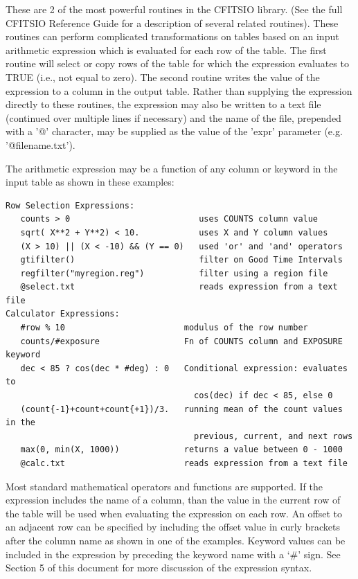 \documentclass[11pt]{article}
\begin{document}
These are 2 of the most powerful routines in the CFITSIO library.  (See
the full CFITSIO Reference Guide for a description of several related
routines).  These routines can perform complicated transformations on
tables based on an input arithmetic expression which is evaluated for
each row of the table.  The first routine will select or copy rows of
the table for which the expression evaluates to TRUE (i.e., not equal
to zero).  The second routine writes the value of the expression to a
column in the output table.  Rather than supplying the expression
directly to these routines, the expression may also be written to a
text file (continued over multiple lines if necessary) and the name of
the file, prepended with a '@' character, may be supplied as the value
of the 'expr' parameter (e.g.  '@filename.txt').

The arithmetic expression may be a function of any column or keyword in
the input table as shown in these examples:

\begin{verbatim}
Row Selection Expressions:
   counts > 0                          uses COUNTS column value
   sqrt( X**2 + Y**2) < 10.            uses X and Y column values
   (X > 10) || (X < -10) && (Y == 0)   used 'or' and 'and' operators
   gtifilter()                         filter on Good Time Intervals
   regfilter("myregion.reg")           filter using a region file
   @select.txt                         reads expression from a text file
Calculator Expressions:
   #row % 10                        modulus of the row number
   counts/#exposure                 Fn of COUNTS column and EXPOSURE keyword
   dec < 85 ? cos(dec * #deg) : 0   Conditional expression: evaluates to
                                      cos(dec) if dec < 85, else 0
   (count{-1}+count+count{+1})/3.   running mean of the count values in the
                                      previous, current, and next rows
   max(0, min(X, 1000))             returns a value between 0 - 1000
   @calc.txt                        reads expression from a text file
\end{verbatim}

Most standard mathematical operators and functions are supported.  If
the expression includes the name of a column, than the value in the
current row of the table will be used when evaluating the expression on
each row.   An offset to an adjacent row can be specified by including
the offset value in curly brackets after the column name as shown in
one of the examples.  Keyword values can be included in the expression
by preceding the keyword name with a `\#' sign.   See Section 5 of this
document for more discussion of the expression syntax.
\end{document}

